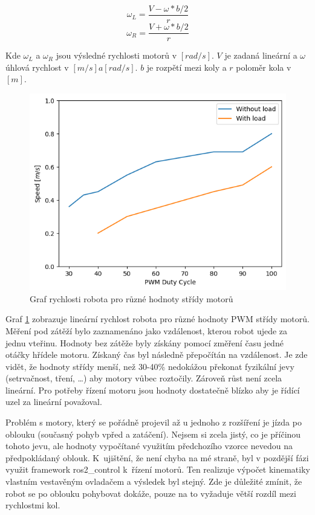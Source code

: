 \begin{equation}
	\omega_L = \frac{V - \omega * b/2}{r}
\end{equation}
\begin{equation}
	\omega_R = \frac{V + \omega * b/2}{r}
\end{equation}

\noindent Kde $\omega_L$ a $\omega_R$ jsou výsledné rychlosti motorů v $[rad/s]$. $V$ je zadaná lineární a $\omega$ úhlová rychlost v $[m/s] a [rad/s]$. $b$ je rozpětí mezi koly a $r$ poloměr kola v $[m]$. \cite{diff_drive}

\begin{figure}[h!]
	\centering
	\includegraphics[scale=0.75]{obrazky-figures/motors_graph.png}
	\caption{Graf rychlosti robota pro různé hodnoty střídy motorů}
	\label{fig:motor_pwm_graph}
\end{figure}
Graf \ref{fig:motor_pwm_graph} zobrazuje lineární rychlost robota pro různé hodnoty PWM střídy motorů. Měření pod zátěží bylo zaznamenáno jako vzdálenost, kterou robot ujede za jednu vteřinu. Hodnoty bez zátěže byly získány pomocí změření času jedné otáčky hřídele motoru. Získaný čas byl následně přepočítán na vzdálenost. Je zde vidět, že hodnoty střídy menší, než 30-40\% nedokážou překonat fyzikální jevy (setrvačnost, tření, \dots) aby motory vůbec roztočily. Zároveň růst není zcela lineární. Pro potřeby řízení motoru jsou hodnoty dostatečně blízko aby je řídící uzel za lineární považoval.

Problém s motory, který se pořádně projevil až u jednoho z rozšíření je jízda po oblouku (současný pohyb vpřed a zatáčení). Nejsem si zcela jistý, co je příčinou tohoto jevu, ale hodnoty vypočítané využitím předchozího vzorce nevedou na předpokládaný oblouk. K~ujištění, že není chyba na mé straně, byl v pozdější fázi využit framework ros2\_control k~řízení motorů. Ten realizuje výpočet kinematiky vlastním vestavěným ovladačem a výsledek byl stejný. Zde je důležité zmínit, že robot se po oblouku pohybovat dokáže, pouze na to vyžaduje větší rozdíl mezi rychlostmi kol.

